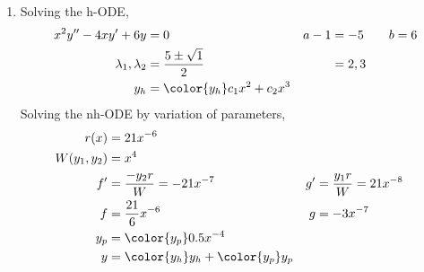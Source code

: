 \begin{enumerate}
    \item Solving the h-ODE,
          \begin{align}
              x^{2}y'' - 4xy' + 6y     & = 0                                     & a - 1 & = -5 \qquad b = 6 \\
              \lambda_{1}, \lambda_{2} & = \frac{5 \pm \sqrt{1}}{2}              &       & = 2, 3            \\
              y_{h}                    & = {\color{y_h} c_{1}x^{2} + c_{2}x^{3}}
          \end{align}
          Solving the nh-ODE by variation of parameters,
          \begin{align}
              r(x)            & = 21x^{-6}                                                                       \\
              W(y_{1}, y_{2}) & = x^{4}                                                                          \\
              f'              & = \frac{-y_{2}r}{W} = -21x^{-7}             & g' & = \frac{y_{1}r}{W} = 21x^{-8} \\
              f               & = \frac{21}{6}x^{-6}                        & g  & = -3x^{-7}                    \\
              y_{p}           & = {\color{y_p} 0.5x^{-4}}                                                        \\
              y               & = {\color{y_h} y_{h}} + {\color{y_p} y_{p}}
          \end{align}


\end{enumerate}
